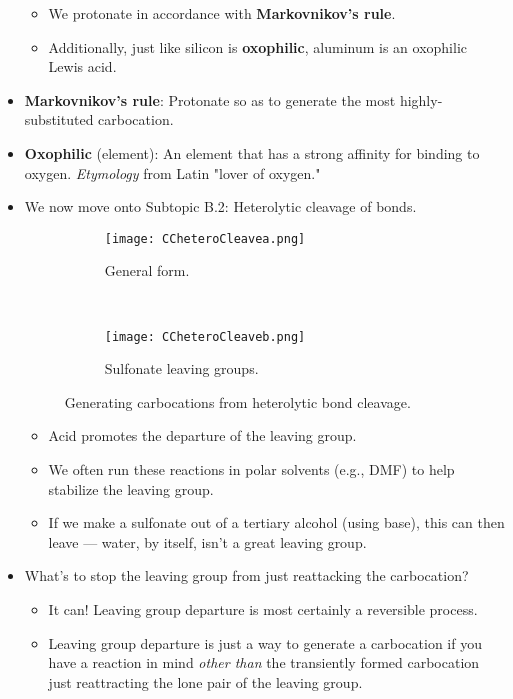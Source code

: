 \documentclass[../notes.tex]{subfiles}
\begin{document}
\begin{itemize}
\begin{itemize}
        \item We protonate in accordance with \textbf{Markovnikov's rule}.
        \item Additionally, just like silicon is \textbf{oxophilic}, aluminum is an oxophilic Lewis acid.
    \end{itemize}
    \item \textbf{Markovnikov's rule}: Protonate so as to generate the most highly-substituted carbocation.
    \item \textbf{Oxophilic} (element): An element that has a strong affinity for binding to oxygen. \emph{Etymology} from Latin "lover of oxygen."
    \item We now move onto Subtopic B.2: Heterolytic cleavage of  bonds.
    \begin{figure}[h!]
        \centering
        \begin{subfigure}[b]{\linewidth}
            \centering
            \texttt{[image: CCheteroCleavea.png]}
            \caption{General form.}
            \label{fig:CCheteroCleavea}
        \end{subfigure}\\[2em]
        \begin{subfigure}[b]{\linewidth}
            \centering
            \texttt{[image: CCheteroCleaveb.png]}
            \caption{Sulfonate leaving groups.}
            \label{fig:CCheteroCleaveb}
        \end{subfigure}
        \caption{Generating carbocations from heterolytic  bond cleavage.}
        \label{fig:CCheteroCleave}
    \end{figure}
    \begin{itemize}
        \item Acid promotes the departure of the leaving group.
        \item We often run these reactions in polar solvents (e.g., DMF) to help stabilize the leaving group.
        \item If we make a sulfonate out of a tertiary alcohol (using base), this can then leave --- water, by itself, isn't a great leaving group.
    \end{itemize}
    \item What's to stop the leaving group from just reattacking the carbocation?
    \begin{itemize}
        \item It can! Leaving group departure is most certainly a reversible process.
        \item Leaving group departure is just a way to generate a carbocation if you have a reaction in mind \emph{other than} the transiently formed carbocation just reattracting the lone pair of the leaving group.

\end{itemize}
\end{itemize}
\end{document}
